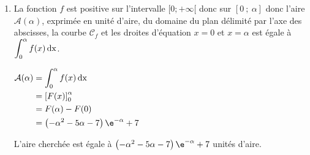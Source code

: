 \begin{enumerate}
Pour tout réel $x$ : $x^2+3x+2 =(x+2)(x+1)$ 

Les racines sont donc $-2$ et $-1$.

De plus le coefficient dominant est positif donc $x^2+3x+2$ est positif, entre autre, sur l'intervalle $]-1~;~ +\infty[$ et donc sur l'intervalle $[0~;~+\infty[$.

La fonction $f$ est donc positive sur l'intervalle $[0~;~+\infty[$.

\item La fonction $f$ est positive sur l'intervalle $[0;+\infty[$ donc sur $[0~;~\alpha]$ donc l'aire $\mathcal{A}(\alpha)$, exprimée en unité d'aire, du domaine du plan délimité par l'axe des abscisses, la courbe $\mathcal{C}_{f}$ et les droites d'équation $x=0$ et $x=\alpha$ est égale à $\displaystyle  \int_0^{\alpha}f(x) \,\rm{d} x$.

$\begin{aligned} \mathcal{A}(\alpha) & = \displaystyle  \int_0^{\alpha}f(x) \,\rm{d} x\\
	& = {\left[ F(x) \right]}_0^{\alpha}\\
	& = F(\alpha)-F(0)\\
	&= \left( -\alpha^2-5\alpha-7\right)\e^{-\alpha}+ 7
\end{aligned}$

L'aire cherchée est égale à $ \left( -\alpha^2-5\alpha-7\right)\e^{-\alpha}+7$ unités d'aire.

\end{enumerate}
